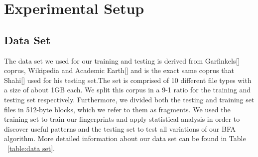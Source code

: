 \chapter{Experimental Setup}


\section{Data Set}
The data set we used for our training and testing is derived from  Garfinkels[] coprus, Wikipedia and Academic Earth[] and is the exact same coprus that Shahi[] used for his testing set.The set is comprised of 10 different file types with a size of about 1GB each. We split this corpus in a 9-1 ratio for the training and testing set respectively. 
Furthermore, we divided both the testing and training set files in 512-byte blocks, which we refer to them as fragments. We used the training set to train our fingerprints and apply statistical analysis in order to discover useful patterns and the testing set to test all variations of our BFA algorithm. More detailed information about our data set can be found in Table ~\ref{table:data set}.




